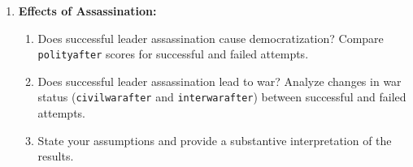 \documentclass[12pt]{article}
\begin{document}
\begin{enumerate}
    \item \textbf{Effects of Assassination:}
    \begin{enumerate}
        \item Does successful leader assassination cause democratization? Compare \texttt{polityafter} scores for successful and failed attempts.
        \item Does successful leader assassination lead to war? Analyze changes in war status (\texttt{civilwarafter} and \texttt{interwarafter}) between successful and failed attempts.
        \item State your assumptions and provide a substantive interpretation of the results.
    \end{enumerate}
\end{enumerate}

% 
% 
\end{document}

